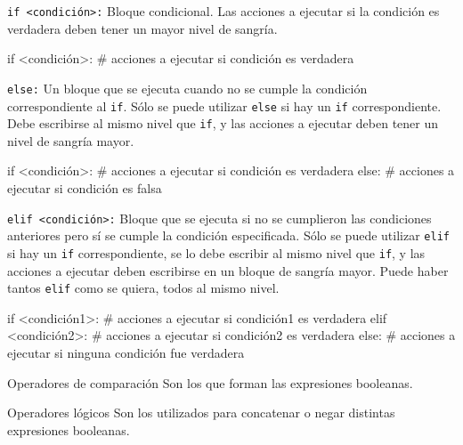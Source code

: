 \begin{referencia_python}

\begin{sintaxis}{\lstinline!if <condición>:!}
Bloque condicional.  Las acciones a ejecutar si la condición
es verdadera deben tener un mayor nivel de sangría.
\begin{codigo-python-sn}
if <condición>:
    # acciones a ejecutar si condición es verdadera
\end{codigo-python-sn}
\end{sintaxis}

\begin{sintaxis}{\lstinline!else:!}
Un bloque que se ejecuta cuando no se cumple la condición
correspondiente al \lstinline!if!.  Sólo se puede utilizar
\lstinline!else! si hay un \lstinline!if! correspondiente.  Debe
escribirse al mismo nivel que \lstinline!if!, y las acciones a ejecutar
deben tener un nivel de sangría mayor.
\begin{codigo-python-sn}
if <condición>:
    # acciones a ejecutar si condición es verdadera
else:
    # acciones a ejecutar si condición es falsa
\end{codigo-python-sn}
\end{sintaxis}

\begin{sintaxis}{\lstinline!elif <condición>:!}
Bloque que se ejecuta si no se cumplieron las condiciones
anteriores pero sí se cumple la condición especificada.  Sólo se puede utilizar
\lstinline!elif! si hay un \lstinline!if! correspondiente, se lo debe
escribir al mismo nivel que \lstinline!if!, y las acciones a ejecutar deben
escribirse en un bloque de sangría mayor.  Puede haber tantos
\lstinline!elif! como se quiera, todos al mismo nivel.
\begin{codigo-python-sn}
if <condición1>:
    # acciones a ejecutar si condición1 es verdadera
elif <condición2>:
    # acciones a ejecutar si condición2 es verdadera
else:
    # acciones a ejecutar si ninguna condición fue verdadera
\end{codigo-python-sn}
\end{sintaxis}

\begin{sintaxis}{Operadores de comparación}
Son los que forman las expresiones booleanas.

\tablaComparacion
\end{sintaxis}

\begin{sintaxis}{Operadores lógicos}
Son los utilizados para concatenar o negar distintas expresiones booleanas.

\tablaOperadoresLogicos
\end{sintaxis}

\end{referencia_python}



